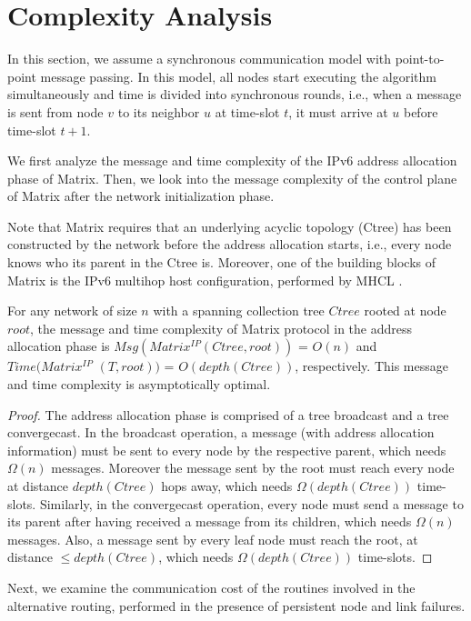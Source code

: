 \section{Complexity Analysis}\label{sec:analysis}

In this section, we assume a synchronous communication model with
point-to-point message passing. In this model, all nodes start
executing the algorithm simultaneously and time is divided into
synchronous rounds, i.e., when a message is sent from node $v$ to
its neighbor $u$ at time-slot $t$, it must arrive at $u$ before
time-slot $t+1$.

We first analyze the message and time complexity of the IPv6 address
allocation phase of Matrix. Then, we look into the message
complexity of the control plane of Matrix after the network
initialization phase.

Note that Matrix requires that an underlying acyclic topology (Ctree) has
been constructed by the network before the address allocation starts, i.e.,
every node knows who its parent in the Ctree is.
Moreover, one of the building blocks of Matrix is the IPv6 multihop host
configuration, performed by MHCL \cite{2016techreport}.

\begin{theorem} \cite{2016techreport} For any network of size $n$ with a
spanning collection tree $Ctree$ rooted at node $root$, the message and time
complexity of Matrix protocol in the address allocation phase is
$Msg(Matrix^{IP}(Ctree, root))$ = $O(n)$ and $Time(Matrix^{IP}$ $(T, root))$
= $O(depth(Ctree))$, respectively. This message and time complexity is
asymptotically optimal.
\end{theorem}
\begin{proof}
The address allocation phase is comprised of a tree broadcast and a tree
convergecast.
In the broadcast operation, a message (with address allocation information) must be
sent to every node by the respective parent, which needs $\Omega(n)$ messages.
Moreover the message sent by the root must reach every node at distance
$depth(Ctree)$ hops away, which needs $\Omega(depth(Ctree))$ time-slots.
Similarly, in the convergecast operation, every node must send a message to its
parent after having received a message from its children, which needs
$\Omega(n)$ messages. Also, a message sent by every leaf node must reach the
root, at distance $\leq depth(Ctree)$, which needs $\Omega(depth(Ctree))$
time-slots.
\end{proof}


Next, we examine the communication cost of the routines involved in
the alternative routing, performed in the presence of persistent
node and link failures.

